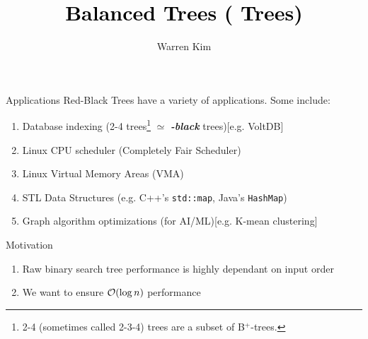 \documentclass[aspectratio=169]{beamer}
\title{\textcolor{black}{Balanced Trees (\textib{\textcolor{red}{Red}}\textib{-Black} Trees)}}
\author{Warren Kim}
\date{}
\newcommand{\textib}[1]{\textit{\textbf{{#1}}}}
\begin{document}
\maketitle

\begin{frame}{Applications}
    Red-Black Trees have a variety of applications. Some include:
    \begin{enumerate}[label=\textit{(\roman*)}]
        \item Database indexing (2-4 trees\footnote{2-4 (sometimes called 2-3-4) trees are a subset
            of B$^+$-trees.} $\simeq$ \textib{\color{red}{red}}\textib{-black} trees)[e.g. VoltDB]
        \item<2-> Linux CPU scheduler (Completely Fair Scheduler)
        \item<3-> Linux Virtual Memory Areas (VMA)
        \item<4-> STL Data Structures (e.g. C++'s \texttt{std::map}, Java's \texttt{HashMap})
        \item<5-> Graph algorithm optimizations (for AI/ML)[e.g. K-mean clustering]
    \end{enumerate}
\end{frame}

\begin{frame}{Motivation}
    \begin{enumerate}[label=\textit{(\roman*)}]
        \item Raw binary search tree performance is highly dependant on input order
        \item We want to ensure ${\cal{O}}(\log n)$ performance
    \end{enumerate}
\end{frame}
\end{document}
